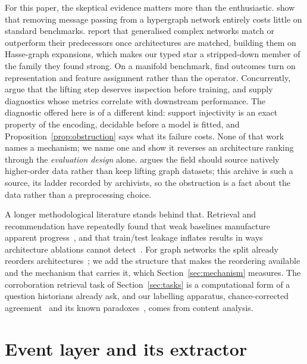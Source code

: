 \documentclass[conference]{IEEEtran}
\begin{document}
For this paper, the skeptical evidence matters more than the enthusiastic.
\citet{tang2024hypergraphmlp} show that removing message passing from a
hypergraph network entirely costs little on standard benchmarks.
\citet{papillon2024topotune} report that generalised complex networks match or outperform
their predecessors once architectures are matched, building them on Hasse-graph
expansions, which makes our typed star a stripped-down member of the family they found
strong. On a manifold benchmark, \citet{schmidt2026triangulation} find outcomes turn on
representation and feature assignment rather than the operator. Concurrently,
\citet{papillon2026lookbefore} argue that the lifting step deserves inspection before
training, and supply diagnostics whose metrics correlate with downstream performance. The
diagnostic offered here is of a different kind: support injectivity is an exact property of
the encoding, decidable before a model is fitted, and Proposition~\ref{prop:obstruction} says
what its failure costs. None of that work names a mechanism; we name one and show it
reverses an architecture ranking through the \emph{evaluation design} alone.
\citet{rieck2026havegraph} argues the field should source natively higher-order data rather
than keep lifting graph datasets; this archive is such a source, its ladder recorded by
archivists, so the obstruction is a fact about the data rather than a preprocessing choice.

A longer methodological literature stands behind that. Retrieval and recommendation have
repeatedly found that weak baselines manufacture apparent
progress~\citep{dacrema2019worrying}, and that train/test leakage inflates
results in ways architecture ablations cannot detect~\citep{kapoor2023leakage}. For graph
networks the split already reorders architectures~\citep{shchur2018pitfalls}; we
add the structure that makes the reordering available and the mechanism that carries it,
which Section~\ref{sec:mechanism} measures. The corroboration retrieval task of
Section~\ref{sec:tasks} is a computational form of a question historians already ask, and
our labelling apparatus, chance-corrected agreement~\citep{krippendorff2004content} and its
known paradoxes~\citep{gwet2008ac1}, comes from content analysis.

\section{Event layer and its extractor}
\label{sec:extractor}
\end{document}
